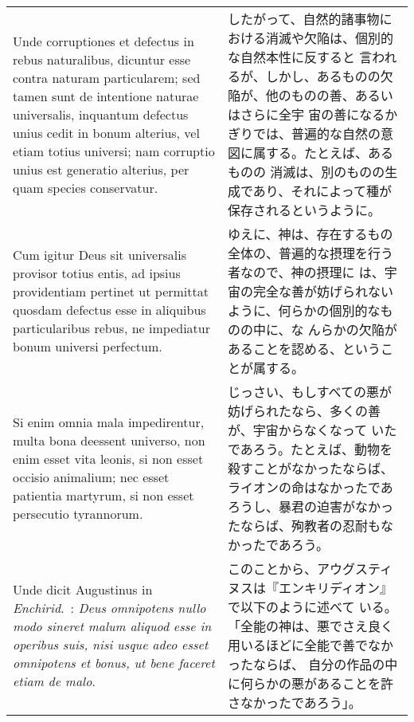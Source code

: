 \documentclass[10pt]{jsarticle} %
\begin{document}
\begin{longtable}{p{21em}p{21em}}
\\


Unde
corruptiones et defectus in rebus naturalibus, dicuntur esse contra
naturam particularem; sed tamen sunt de intentione naturae universalis,
inquantum defectus unius cedit in bonum alterius, vel etiam totius
universi; nam corruptio unius est generatio alterius, per quam species
conservatur. 

&

したがって、自然的諸事物における消滅や欠陥は、個別的な自然本性に反すると
 言われるが、しかし、あるものの欠陥が、他のものの善、あるいはさらに全宇
 宙の善になるかぎりでは、普遍的な自然の意図に属する。たとえば、あるものの
 消滅は、別のものの生成であり、それによって種が保存されるというように。


\\


Cum igitur Deus sit universalis provisor totius entis, ad
ipsius providentiam pertinet ut permittat quosdam defectus esse in
aliquibus particularibus rebus, ne impediatur bonum universi
perfectum. 

&

ゆえに、神は、存在するもの全体の、普遍的な摂理を行う者なので、神の摂理に
 は、宇宙の完全な善が妨げられないように、何らかの個別的なものの中に、な
 んらかの欠陥があることを認める、ということが属する。


\\

Si enim omnia mala impedirentur, multa bona deessent
universo, non enim esset vita leonis, si non esset occisio animalium;
nec esset patientia martyrum, si non esset persecutio tyrannorum. 

&

じっさい、もしすべての悪が妨げられたなら、多くの善が、宇宙からなくなって
 いたであろう。たとえば、動物を殺すことがなかったならば、ライオンの命はなかったであ
 ろうし、暴君の迫害がなかったならば、殉教者の忍耐もなかったであろう。


\\

Unde
dicit Augustinus in {\itshape Enchirid}.~: 
{\itshape Deus omnipotens nullo modo sineret malum
aliquod esse in operibus suis, nisi usque adeo esset omnipotens et
bonus, ut bene faceret etiam de malo}.


&

このことから、アウグスティヌスは『エンキリディオン』で以下のように述べて
 いる。「全能の神は、悪でさえ良く用いるほどに全能で善でなかったならば、
 自分の作品の中に何らかの悪があることを許さなかったであろう」。


\end{longtable}
\end{document}
